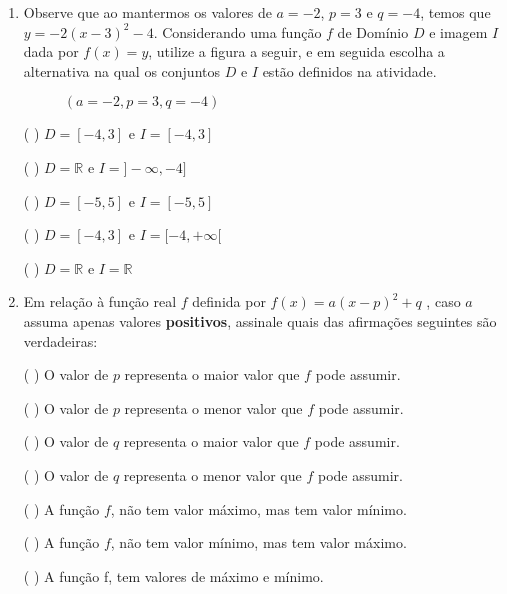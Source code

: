 \documentclass[10 pt,usenames,dvipsnames, oneside]{article}
\begin{document}
\begin{enumerate}
\item {} 
Observe que ao mantermos os valores de \(a=-2\), \(p=3\) e \(q=-4\), temos que \(y=-2(x-3)^2 -4\). Considerando uma função \(f\) de Domínio \(D\) e imagem \(I\) dada por \(f(x)=y\), utilize a figura a seguir, e em seguida escolha a alternativa na qual os conjuntos \(D\) e \(I\) estão definidos na atividade.
\begin{figure}[H]
\centering
{}
\caption{$(a=-2, p=3,q=-4)$}

\end{figure}
({ }{ }{ }) \(D=[-4,3]\) e \(I=[-4,3]\)

({ }{ }{ }) \(D=\mathbb{R}\) e \(I=]-\infty,-4]\)

({ }{ }{ }) \(D=[-5,5]\) e \(I=[-5,5]\)

({ }{ }{ }) \(D=[-4,3]\) e \(I=[-4,+\infty[\)

({ }{ }{ }) \(D=\mathbb{R}\) e \(I=\mathbb{R}\)

\clearpage
\item {} 
Em relação à função real \(f\) definida por \(f(x)=a(x-p)^2+q\) , caso \(a\) assuma apenas valores \textbf{positivos}, assinale quais das afirmações seguintes são verdadeiras:

({ }{ }{ }) O valor de \(p\) representa o maior valor que \(f\) pode assumir.

({ }{ }{ }) O valor de \(p\) representa o menor valor que \(f\) pode assumir.

({ }{ }{ }) O valor de \(q\) representa o maior valor que \(f\) pode assumir.

({ }{ }{ }) O valor de \(q\) representa o menor valor que \(f\) pode assumir.

({ }{ }{ }) A função \(f\), não tem valor máximo, mas tem valor mínimo.

({ }{ }{ }) A função \(f\), não tem valor mínimo, mas tem valor máximo.

({ }{ }{ }) A função f, tem valores de máximo e mínimo.


\end{enumerate}
\end{document}
